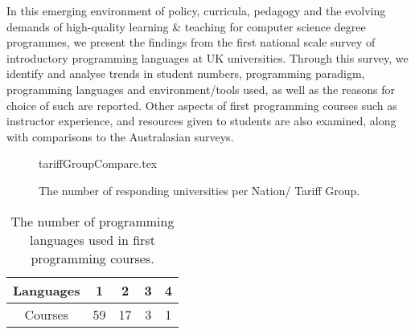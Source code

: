 \documentclass{sig-alternate}
\begin{document}
\iffalse
Alongside this increased scrutiny of standards and outputs for
computer science degrees in UK universities, a Teaching Excellence
Framework\footnote{\url{http://www.hefce.ac.uk/lt/tef/}} has been
proposed as part of proposed new higher education legislation. The
core ambition of the framework is ``to raise the quality and status of
teaching in higher education institutions''; excellence is to be
measured through a series of proxy metrics that include student
satisfaction, retention and graduate employability. There has been
significant concerns about the aims of the framework, as well as the
suitability of the metrics; more so in the context of it benchmarking
and creating leagues tables for ``teaching excellence'', as well as
deciding whether institutions are allowed to raise tuition fees in the
future. The UK's Higher Education Academy -- the national body which
champions teaching quality -- has previously supported initiatives for
improving learning \& teaching in computer science, including
innovative pedagogies for
programming~\cite{crick-et-al-hea:2015,davenport-et-al:latice2016},
but we have not seen the desired cascading of best practice and wider
national impact.
\fi 

In this emerging environment of policy, curricula, pedagogy and the
evolving demands of high-quality learning \& teaching for computer
science degree programmes, we present the findings from the first
national scale survey of introductory programming languages at UK
universities. Through this survey, we identify and analyse trends in
student numbers, programming paradigm, programming languages and
environment/tools used, as well as the reasons for choice of such are
reported. Other aspects of first programming courses such as
instructor experience, %
and resources
given to students are also examined, along with comparisons to the
 Australasian surveys.

\begin{figure}
\begin{center}
{tariffGroupCompare.tex}\vskip-12pt
\caption{The number of responding universities per Nation/   
 Tariff Group.\label{fig:TG}}
\end{center}
\end{figure}

\begin{table}[]
\centering
\caption{The number of programming languages used in first programming courses.\label{tab:numLangs}}
\label{tab:numLanguages}
\begin{tabular}{ccccc}
\hline
Languages & 1  & 2  & 3 & 4 \\ \hline
Courses   & 59 & 17 & 3 & 1 \\ \hline
\end{tabular}
\end{table}
\end{document}
